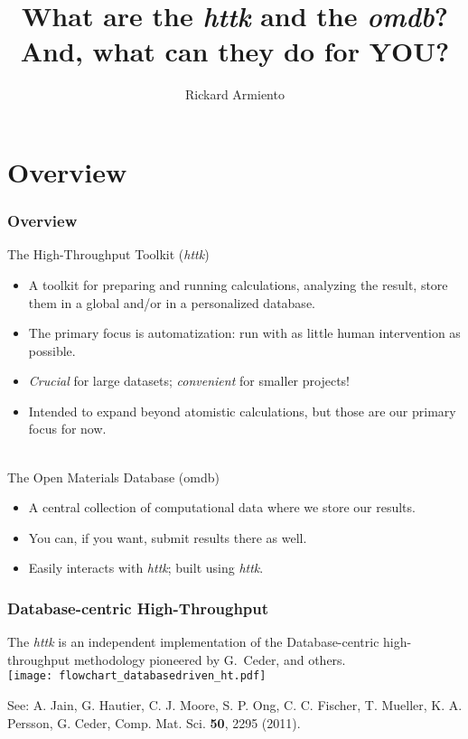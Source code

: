 \documentclass[dvipsnames]{beamer}
\title[httk and omdb]{What are the \emph{httk} and the \emph{omdb}?\\And, what can they do for YOU?}
\author{Rickard Armiento} %
\institute[LiU]{Link{\"o}ping University, Sweden} %
\begin{document}
\begin{frame}
\titlepage 
\end{frame}

\section{Overview}
\begin{frame}
\frametitle{Overview}
{\color{blue} The High-Throughput Toolkit (\emph{httk})}
\begin{itemize}
\item A toolkit for {\color{red}preparing} and {\color{red}running} calculations, {\color{red}analyzing} the result,  {\color{red}store them in a global and/or in a personalized database.}
\item The primary focus is {\color{red} automatization:} run with as little human intervention as possible.
\item \emph{Crucial} for large datasets; \emph{convenient} for smaller projects!
\item Intended to expand beyond atomistic calculations, but those are our primary focus for now.
\end{itemize}\strut\\[0.2cm]

{\color{blue}The Open Materials Database (omdb)}
\begin{itemize}
\item A central collection of computational data where we store our results.
\item You can, if you want, submit results there as well.
\item Easily interacts with \emph{httk}; built using \emph{httk}.
\end{itemize}
\end{frame}

\begin{frame}
\frametitle{Database-centric High-Throughput}
The \emph{httk} is an independent implementation of the Database-centric high-throughput methodology pioneered by G.\ Ceder, and others.\\[0.2cm]
{\scriptsize\centering\texttt{[image: flowchart\_databasedriven\_ht.pdf]}\\[0.5cm]}

\raggedright See: A. Jain, G. Hautier, C. J. Moore, S. P. Ong, C. C. Fischer, T. Mueller, K. A. Persson, G. Ceder, Comp. Mat. Sci. \textbf{50}, 2295 (2011).\\
\end{frame}
\end{document}
